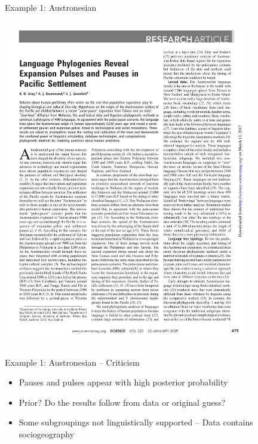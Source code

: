 \documentclass[9pt]{beamer}
\begin{document}
\begin{frame}{Example 1: Austronesian}
\begin{columns}
\begin{column}{0.5\textwidth}
        \includegraphics[width=0.8\textwidth,page=3,trim={1cm 1cm 7.5cm 16cm},clip]{austronesian.pdf}
        
    \end{column}
  \end{columns}
\end{frame}
\begin{frame}{Example 1: Austronesian – Criticism}
  \begin{itemize}
  \item Pauses and pulses appear with high posterior probability
  \item Prior? Do the results follow from data or original guess?
  \item Some subgroupings not linguistically supported – Data contains sociogeography
  \end{itemize}
\end{frame}
\end{document}
